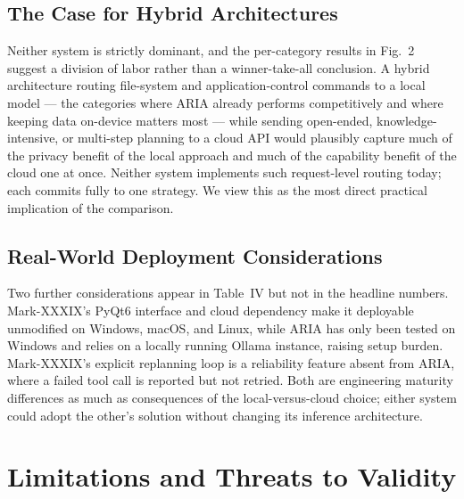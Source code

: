 \documentclass[conference]{IEEEtran}
\begin{document}
\subsection{The Case for Hybrid Architectures}

Neither system is strictly dominant, and the per-category results in Fig.~2 suggest a division of labor rather than a winner-take-all conclusion. A hybrid architecture routing file-system and application-control commands to a local model --- the categories where ARIA already performs competitively and where keeping data on-device matters most --- while sending open-ended, knowledge-intensive, or multi-step planning to a cloud API would plausibly capture much of the privacy benefit of the local approach and much of the capability benefit of the cloud one at once. Neither system implements such request-level routing today; each commits fully to one strategy. We view this as the most direct practical implication of the comparison.

\subsection{Real-World Deployment Considerations}

Two further considerations appear in Table~IV but not in the headline numbers. Mark-XXXIX's PyQt6 interface and cloud dependency make it deployable unmodified on Windows, macOS, and Linux, while ARIA has only been tested on Windows and relies on a locally running Ollama instance, raising setup burden. Mark-XXXIX's explicit replanning loop is a reliability feature absent from ARIA, where a failed tool call is reported but not retried. Both are engineering maturity differences as much as consequences of the local-versus-cloud choice; either system could adopt the other's solution without changing its inference architecture.

\section{Limitations and Threats to Validity}
\end{document}

